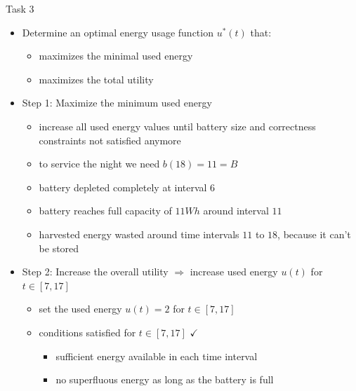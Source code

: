 \begin{frame}[allowframebreaks]{Task 3}{}
  \begin{tasknoinc}
    \begin{itemize}
       \item Determine an optimal energy usage function $u^*(t)$ that:
         \begin{itemize}
            \item \alert{maximizes} the minimal used energy
            \item \alert{maximizes} the total utility
         \end{itemize}
    \end{itemize}
  \end{tasknoinc}
  \framebreak
  \begin{solutionnoinc}
    \begin{itemize}
      \item \alert{Step 1:} Maximize the minimum used energy
      \begin{itemize}
        \item increase all used energy values until battery size and correctness constraints not satisfied anymore
        \item to service the night we need $b(18)=11=B$
        \item battery depleted completely at interval $6$
        \item battery reaches full capacity of $11Wh$ around interval $11$
        \item harvested energy wasted around time intervals $11$ to $18$, because it can't be stored
      \end{itemize}
    \end{itemize}
  \end{solutionnoinc}
  \begin{solutionnoinc}
    \begin{itemize}
      \item \alert{Step 2:} Increase the overall utility $\Rightarrow$ increase used energy $u(t)$ for $t\in [7, 17]$
        \begin{itemize}
          \item set the used energy $u(t) = 2$ for $t\in[7, 17]$
          \item conditions satisfied for $t\in [7, 17]$ $\checkmark$
            \begin{itemize}
              \item sufficient energy available in each time interval
              \item no superfluous energy as long as the battery is full

\end{itemize}
\end{itemize}
\end{itemize}
\end{solutionnoinc}
\end{frame}
